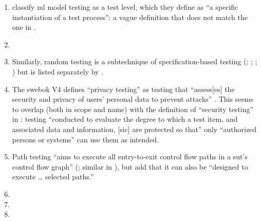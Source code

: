 \begin{enumerate}
    \item %
          \citetISTQB{} classify \acs{ml} model testing as a test level, which
          they define as ``a specific instantiation of a test process'': a vague
          definition that does not match the one in .
    \item %
          \perfSecParFlaw{}
    \item %
          Similarly, random testing is a subtechnique of specification-based
          testing (\citealp[pp.~7, 22]{IEEE2022}; \citeyear[pp.~5, 20, Fig.~2]{IEEE2021c};
          \citealp[p.~5\=/12]{SWEBOK2025}; \citealpISTQB{}) but is listed
          separately by \citet[p.~46]{Firesmith2015}.
    \item %
          The \acs{swebok} V4 defines ``privacy testing'' as testing that
          ``assess[es] the security and privacy of users' personal data to
          prevent attacks'' \citep[p.~5\=/9]{SWEBOK2025}. This seems to
          overlap (both in scope and name) with the definition of ``security
          testing'' in \citep[p.~7]{IEEE2022}: testing
          ``conducted to evaluate the degree to which a test item, and
          associated data and information, [sic] are protected so that'' only
          ``authorized persons or systems'' can use them as intended.
    \item %
          Path testing ``aims to execute all entry-to-exit control flow paths
          in a \acs{sut}'s control flow graph'' (\citealp[p.~5\=/13]{SWEBOK2025};
          similar in \citealp[p.~119]{Patton2006}), but \citet[p.~316]{IEEE2017}
          add that it can also be ``designed to execute \dots{} selected paths.''
    \item %
          \tourFlaw{}
    \item %
          \alphaFlaw{}
    \item %

\end{enumerate}
